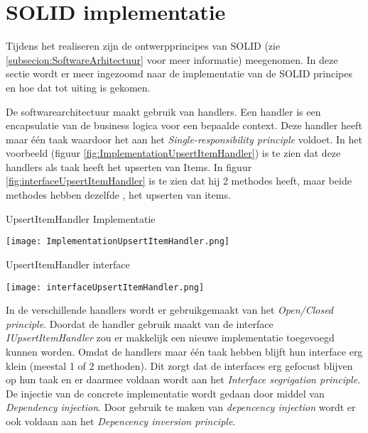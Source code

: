 \section{SOLID implementatie}
Tijdens het realiseren zijn de ontwerpprincipes van SOLID (zie \ref{subsecion:SoftwareArhitectuur} voor meer informatie) meegenomen.
In deze sectie wordt er meer ingezoomd naar de implementatie van de SOLID principes en hoe dat tot uiting is gekomen.

\whitespace
De softwarearchitectuur maakt gebruik van handlers.
Een handler is een encapsulatie van de business logica voor een bepaalde context.
Deze handler heeft maar één taak waardoor het aan het \textit{Single-responsibility principle} voldoet.
In het voorbeeld (figuur \ref{fig:ImplementationUpsertItemHandler}) is te zien dat deze handlers als taak heeft het upserten van Items.
In figuur \ref{fig:interfaceUpsertItemHandler} is te zien dat hij 2 methodes heeft, maar beide methodes hebben dezelfde , het upserten van items.

\whitespace
\begin{graphic}
    \captionsetup{type=figure}
    \caption{UpsertItemHandler Implementatie}
    \texttt{[image: ImplementationUpsertItemHandler.png]}
    \label{fig:ImplementationUpsertItemHandler}
\end{graphic}

\whitespace[2]
\begin{graphic}
    \captionsetup{type=figure}
    \caption{UpsertItemHandler interface}
    \texttt{[image: interfaceUpsertItemHandler.png]}
    \label{fig:interfaceUpsertItemHandler}
\end{graphic}

\whitespace
In de verschillende handlers wordt er gebruikgemaakt van het \textit{Open\slash Closed principle}.
Doordat de handler gebruik maakt van de interface \textit{IUpsertItemHandler} zou er makkelijk een nieuwe implementatie toegevoegd kunnen worden.
%
%
%
%
%
Omdat de handlers maar één taak hebben blijft hun interface erg klein (meestal 1 of 2 methoden).
Dit zorgt dat de interfaces erg gefocust blijven op hun taak en er daarmee voldaan wordt aan het \textit{Interface segrigation principle}.
De injectie van de concrete implementatie wordt gedaan door middel van \textit{Dependency injection}.
Door gebruik te maken van \textit{depencency injection} wordt er ook voldaan aan het \textit{Depencency inversion principle}.

